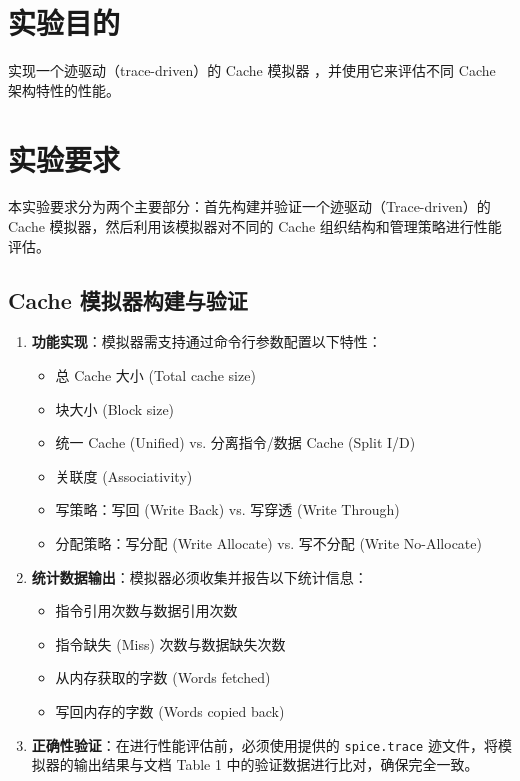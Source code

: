 \documentclass[12pt,a4paper]{article}
\begin{document}

\maketoc

\section{实验目的}
实现一个迹驱动（trace-driven）的 Cache 模拟器 ，并使用它来评估不同 Cache 架构特性的性能。

\section{实验要求}

本实验要求分为两个主要部分：首先构建并验证一个迹驱动（Trace-driven）的 Cache 模拟器，然后利用该模拟器对不同的 Cache 组织结构和管理策略进行性能评估。

\subsection{Cache 模拟器构建与验证}

\begin{enumerate}
    \item \textbf{功能实现}：模拟器需支持通过命令行参数配置以下特性：
    \begin{itemize}
        \item 总 Cache 大小 (Total cache size)
        \item 块大小 (Block size)
        \item 统一 Cache (Unified) vs. 分离指令/数据 Cache (Split I/D)
        \item 关联度 (Associativity)
        \item 写策略：写回 (Write Back) vs. 写穿透 (Write Through)
        \item 分配策略：写分配 (Write Allocate) vs. 写不分配 (Write No-Allocate)
    \end{itemize}
    
    \item \textbf{统计数据输出}：模拟器必须收集并报告以下统计信息：
    \begin{itemize}
        \item 指令引用次数与数据引用次数
        \item 指令缺失 (Miss) 次数与数据缺失次数
        \item 从内存获取的字数 (Words fetched)
        \item 写回内存的字数 (Words copied back)
    \end{itemize}
    
    \item \textbf{正确性验证}：在进行性能评估前，必须使用提供的 \texttt{spice.trace} 迹文件，将模拟器的输出结果与文档 Table 1 中的验证数据进行比对，确保完全一致。
\end{enumerate}
\end{document}
